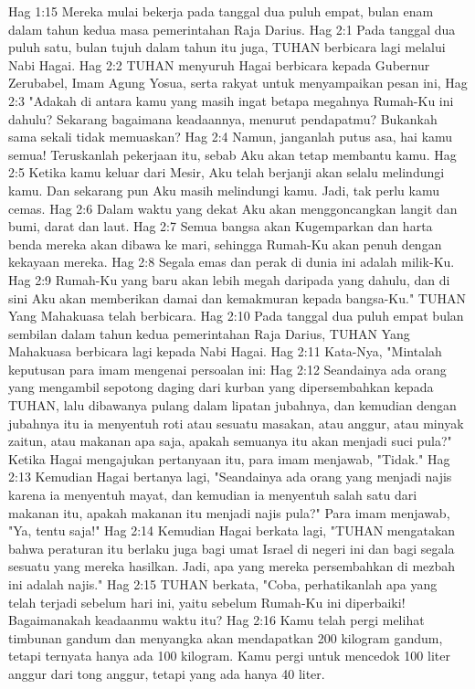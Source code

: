 Hag 1:15  Mereka mulai bekerja pada tanggal dua puluh empat, bulan enam dalam tahun kedua masa pemerintahan Raja Darius.
Hag 2:1  Pada tanggal dua puluh satu, bulan tujuh dalam tahun itu juga, TUHAN berbicara lagi melalui Nabi Hagai.
Hag 2:2  TUHAN menyuruh Hagai berbicara kepada Gubernur Zerubabel, Imam Agung Yosua, serta rakyat untuk menyampaikan pesan ini,
Hag 2:3  "Adakah di antara kamu yang masih ingat betapa megahnya Rumah-Ku ini dahulu? Sekarang bagaimana keadaannya, menurut pendapatmu? Bukankah sama sekali tidak memuaskan?
Hag 2:4  Namun, janganlah putus asa, hai kamu semua! Teruskanlah pekerjaan itu, sebab Aku akan tetap membantu kamu.
Hag 2:5  Ketika kamu keluar dari Mesir, Aku telah berjanji akan selalu melindungi kamu. Dan sekarang pun Aku masih melindungi kamu. Jadi, tak perlu kamu cemas.
Hag 2:6  Dalam waktu yang dekat Aku akan menggoncangkan langit dan bumi, darat dan laut.
Hag 2:7  Semua bangsa akan Kugemparkan dan harta benda mereka akan dibawa ke mari, sehingga Rumah-Ku akan penuh dengan kekayaan mereka.
Hag 2:8  Segala emas dan perak di dunia ini adalah milik-Ku.
Hag 2:9  Rumah-Ku yang baru akan lebih megah daripada yang dahulu, dan di sini Aku akan memberikan damai dan kemakmuran kepada bangsa-Ku." TUHAN Yang Mahakuasa telah berbicara.
Hag 2:10  Pada tanggal dua puluh empat bulan sembilan dalam tahun kedua pemerintahan Raja Darius, TUHAN Yang Mahakuasa berbicara lagi kepada Nabi Hagai.
Hag 2:11  Kata-Nya, "Mintalah keputusan para imam mengenai persoalan ini:
Hag 2:12  Seandainya ada orang yang mengambil sepotong daging dari kurban yang dipersembahkan kepada TUHAN, lalu dibawanya pulang dalam lipatan jubahnya, dan kemudian dengan jubahnya itu ia menyentuh roti atau sesuatu masakan, atau anggur, atau minyak zaitun, atau makanan apa saja, apakah semuanya itu akan menjadi suci pula?" Ketika Hagai mengajukan pertanyaan itu, para imam menjawab, "Tidak."
Hag 2:13  Kemudian Hagai bertanya lagi, "Seandainya ada orang yang menjadi najis karena ia menyentuh mayat, dan kemudian ia menyentuh salah satu dari makanan itu, apakah makanan itu menjadi najis pula?" Para imam menjawab, "Ya, tentu saja!"
Hag 2:14  Kemudian Hagai berkata lagi, "TUHAN mengatakan bahwa peraturan itu berlaku juga bagi umat Israel di negeri ini dan bagi segala sesuatu yang mereka hasilkan. Jadi, apa yang mereka persembahkan di mezbah ini adalah najis."
Hag 2:15  TUHAN berkata, "Coba, perhatikanlah apa yang telah terjadi sebelum hari ini, yaitu sebelum Rumah-Ku ini diperbaiki! Bagaimanakah keadaanmu waktu itu?
Hag 2:16  Kamu telah pergi melihat timbunan gandum dan menyangka akan mendapatkan 200 kilogram gandum, tetapi ternyata hanya ada 100 kilogram. Kamu pergi untuk mencedok 100 liter anggur dari tong anggur, tetapi yang ada hanya 40 liter.
